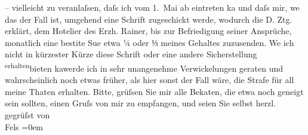 \begin{ledgroupsized}[t]{13cm}
               – vielleicht zu veranlaſsen, daſs ich vom 1. Mai ab eintreten ka{\geminationn} und  daſs mir, we{\geminationn} das der Fall ist, umgehend eine Schrift zugeschickt
               werde, wodurch die D. Ztg. erklärt, dem Hotelier des Erzh. Rainer, bis zur Befriedigung seiner
               Ansprüche, monatlich eine besti{\geminationm}te Su{\geminationm}e etwa ¼ \introOben{}oder ⅓\introOben{} meines
               Gehaltes zuzusenden. We{\geminationn} ich nicht in kürzester Kürze
               diese Schrift oder eine andere Sicherstellung \substVorne{}\textsuperscript{erhalten}{\allowbreak}\substDazwischen{}bieten ka{\geminationn}\substHinten{}{ }{\pb}werde ich in sehr unangenehme Verwickelungen geraten
               und wahrscheinlich noch etwas früher, als hier sonst der Fall wäre, die Strafe für
               all meine Thaten erhalten.\pend
           \pstart
           Bitte, grüſsen Sie mir alle Beka{\geminationn}ten, die etwa noch
               geneigt sein sollten, einen Gruſs von mir zu empfangen, und seien Sie selbst herzl.
               gegrüſst\pend
           \pstart
           von{\\[\baselineskip]}\spacefill\mbox{Fels}\pend
           \leftskip=0em{}
         
         \endnumbering{}\end{ledgroupsized}  \newcommand{\dateiname}{L00198}\newcommand{\titel}{Friedrich M. Fels an Arthur Schnitzler, 20. 4. 1893}\newcommand{\editorInnen}{Martin Anton Müller und Gerd-Hermann Susen}
      